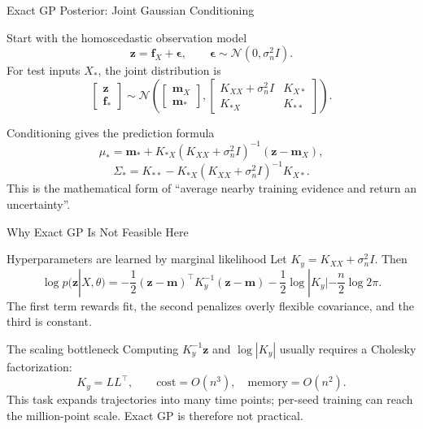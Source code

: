 \documentclass[UTF8,aspectratio=169]{ctexbeamer}
\begin{document}
\begin{frame}{Exact GP Posterior: Joint Gaussian Conditioning}
\small
\begin{block}{Start with the homoscedastic observation model}
\footnotesize
\[
\mathbf z=\mathbf f_X+\boldsymbol\epsilon,
\qquad
\boldsymbol\epsilon\sim\mathcal N(0,\sigma_n^2I).
\]
For test inputs \(X_*\), the joint distribution is
\[
\begin{bmatrix}
\mathbf z\\
\mathbf f_*
\end{bmatrix}
\sim
\mathcal N\left(
\begin{bmatrix}
\mathbf m_X\\
\mathbf m_*
\end{bmatrix},
\begin{bmatrix}
K_{XX}+\sigma_n^2I & K_{X*}\\
K_{*X} & K_{**}
\end{bmatrix}
\right).
\]
\end{block}

\begin{block}{Conditioning gives the prediction formula}
\footnotesize
\[
\mu_*=\mathbf m_*+K_{*X}(K_{XX}+\sigma_n^2I)^{-1}(\mathbf z-\mathbf m_X),
\]
\[
\Sigma_*=K_{**}-K_{*X}(K_{XX}+\sigma_n^2I)^{-1}K_{X*}.
\]
This is the mathematical form of ``average nearby training evidence and return
an uncertainty''.
\end{block}
\end{frame}

\begin{frame}{Why Exact GP Is Not Feasible Here}
\small
\begin{block}{Hyperparameters are learned by marginal likelihood}
\footnotesize
Let \(K_y=K_{XX}+\sigma_n^2I\). Then
\[
\log p(\mathbf z|X,\theta)
=-\frac{1}{2}(\mathbf z-\mathbf m)^\top K_y^{-1}(\mathbf z-\mathbf m)
-\frac{1}{2}\log|K_y|-\frac{n}{2}\log 2\pi.
\]
The first term rewards fit, the second penalizes overly flexible covariance,
and the third is constant.
\end{block}

\begin{block}{The scaling bottleneck}
\footnotesize
Computing \(K_y^{-1}\mathbf z\) and \(\log|K_y|\) usually requires a Cholesky
factorization:
\[
K_y=LL^\top,\qquad \mathrm{cost}=O(n^3),\quad \mathrm{memory}=O(n^2).
\]
This task expands trajectories into many time points; per-seed training can
reach the million-point scale. Exact GP is therefore not practical.
\end{block}
\end{frame}
\end{document}
